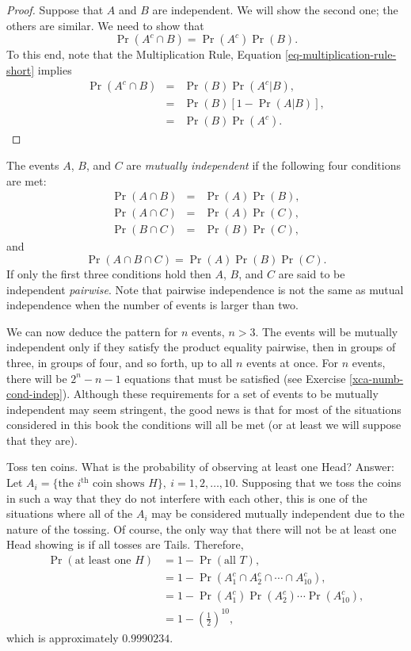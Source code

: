 \documentclass[captions=tableheading]{scrbook}
\begin{document}
\begin{proof}
Suppose that \(A\) and \(B\) are independent. We will show the second one; the others are similar. We need to show that
\[
\Pr(A^{c}\cap B)=\Pr(A^{c})\Pr(B).
\]
To this end, note that the Multiplication Rule, Equation \ref{eq-multiplication-rule-short} implies 
\begin{eqnarray*}
\Pr(A^{c}\cap B) & = & \Pr(B)\Pr(A^{c}|B),\\
 & = & \Pr(B)[1-\Pr(A|B)],\\
 & = & \Pr(B)\Pr(A^{c}).
\end{eqnarray*}
\end{proof}

\begin{defn}
The events \(A\), \(B\), and \(C\) are \emph{mutually independent} if the following four conditions are met: 
\begin{eqnarray*}
\Pr(A\cap B) & = & \Pr(A)\Pr(B),\\
\Pr(A\cap C) & = & \Pr(A)\Pr(C),\\
\Pr(B\cap C) & = & \Pr(B)\Pr(C),
\end{eqnarray*}
and
\[
\Pr(A\cap B\cap C)=\Pr(A)\Pr(B)\Pr(C).
\]
If only the first three conditions hold then \(A\), \(B\), and \(C\) are said to be independent \emph{pairwise}. Note that pairwise independence is not the same as mutual independence when the number of events is larger than two.
\end{defn}

We can now deduce the pattern for \(n\) events, \(n>3\). The events will be mutually independent only if they satisfy the product equality pairwise, then in groups of three, in groups of four, and so forth, up to all \(n\) events at once. For \(n\) events, there will be \(2^{n}-n-1\) equations that must be satisfied (see Exercise \ref{xca-numb-cond-indep}). Although these requirements for a set of events to be mutually independent may seem stringent, the good news is that for most of the situations considered in this book the conditions will all be met (or at least we will suppose that they are).

\begin{example}
Toss ten coins. What is the probability of observing at least one Head? Answer: Let \(A_{i}= \{ \mbox{the }i^{\mathrm{th}}\mbox{ coin shows }H \} ,\ i=1,2,\ldots,10\). Supposing that we toss the coins in such a way that they do not interfere with each other, this is one of the situations where all of the \(A_{i}\) may be considered mutually independent due to the nature of the tossing. Of course, the only way that there will not be at least one Head showing is if all tosses are Tails. Therefore,
\begin{align*}
\Pr(\mbox{at least one }H) & =1-\Pr(\mbox{all }T),\\
 & =1-\Pr(A_{1}^{c}\cap A_{2}^{c}\cap\cdots\cap A_{10}^{c}),\\
 & =1-\Pr(A_{1}^{c})\Pr(A_{2}^{c})\cdots\Pr(A_{10}^{c}),\\
 & =1-\left(\frac{1}{2}\right)^{10},
\end{align*}
which is approximately \(0.9990234\).

\end{example}
\end{document}
